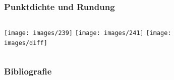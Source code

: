 \documentclass[aspectratio=169]{beamer}
\begin{document}
\begin{frame}
    \frametitle{Punktdichte und Rundung}
    \begin{columns}
    \centering
    \texttt{[image: images/239]}%
    \texttt{[image: images/241]}
    \texttt{[image: images/diff]}
    
        \begin{figure}
            \centering
                \label{fig:umlquerylife}
            \end{figure}
        \end{columns}
\end{frame}

\begin{frame}[allowframebreaks]
    \frametitle{Bibliografie}
    \printbibliography{}
\end{frame}
\end{document}
